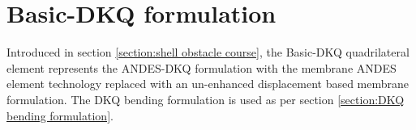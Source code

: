 
\chapter{Basic-DKQ formulation}
\label{sec:Basic-DKQ quadrilateral formulation}

Introduced in section \ref{section:shell obstacle course}, the Basic-DKQ quadrilateral element represents the ANDES-DKQ formulation with the membrane ANDES element technology replaced with an un-enhanced displacement based membrane formulation. The DKQ bending formulation is used as per section \ref{section:DKQ bending formulation}.

